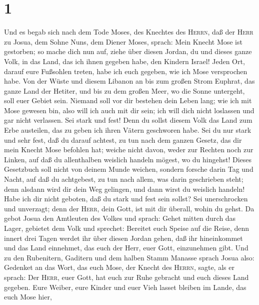 \hypertarget{section}{%
\section{1}\label{section}}

 Und es begab sich nach dem Tode Moses, des Knechtes des
\textsc{Herrn}, daß der \textsc{Herr} zu Josua, dem Sohne Nuns, dem
Diener Moses, sprach:  Mein Knecht Mose ist gestorben; so
mache dich nun auf, ziehe über diesen Jordan, du und dieses ganze Volk,
in das Land, das ich ihnen gegeben habe, den Kindern Israel!
 Jeden Ort, darauf eure Fußsohlen treten, habe ich euch
gegeben, wie ich Mose versprochen habe.  Von der Wüste und
diesem Libanon an bis zum großen Strom Euphrat, das ganze Land der
Hetiter, und bis zu dem großen Meer, wo die Sonne untergeht, soll euer
Gebiet sein.  Niemand soll vor dir bestehen dein Leben
lang; wie ich mit Mose gewesen bin, also will ich auch mit dir sein; ich
will dich nicht loslassen und gar nicht verlassen.  Sei
stark und fest! Denn du sollst diesem Volk das Land zum Erbe austeilen,
das zu geben ich ihren Vätern geschworen habe.  Sei du nur
stark und sehr fest, daß du darauf achtest, zu tun nach dem ganzen
Gesetz, das dir mein Knecht Mose befohlen hat; weiche nicht davon, weder
zur Rechten noch zur Linken, auf daß du allenthalben weislich handeln
mögest, wo du hingehst!  Dieses Gesetzbuch soll nicht von
deinem Munde weichen, sondern forsche darin Tag und Nacht, auf daß du
achtgebest, zu tun nach allem, was darin geschrieben steht; denn alsdann
wird dir dein Weg gelingen, und dann wirst du weislich handeln!
 Habe ich dir nicht geboten, daß du stark und fest sein
sollst? Sei unerschrocken und unverzagt; denn der \textsc{Herr}, dein
Gott, ist mit dir überall, wohin du gehst.  Da gebot
Josua den Amtleuten des Volkes und sprach:  Gehet mitten
durch das Lager, gebietet dem Volk und sprechet: Bereitet euch Speise
auf die Reise, denn innert drei Tagen werdet ihr über diesen Jordan
gehen, daß ihr hineinkommet und das Land einnehmet, das euch der Herr,
euer Gott, einzunehmen gibt.  Und zu den Rubenitern,
Gaditern und dem halben Stamm Manasse sprach Josua also: 
Gedenket an das Wort, das euch Mose, der Knecht des \textsc{Herrn},
sagte, als er sprach: Der \textsc{Herr}, euer Gott, hat euch zur Ruhe
gebracht und euch dieses Land gegeben.  Eure Weiber, eure
Kinder und euer Vieh lasset bleiben im Lande, das euch Mose hier,
